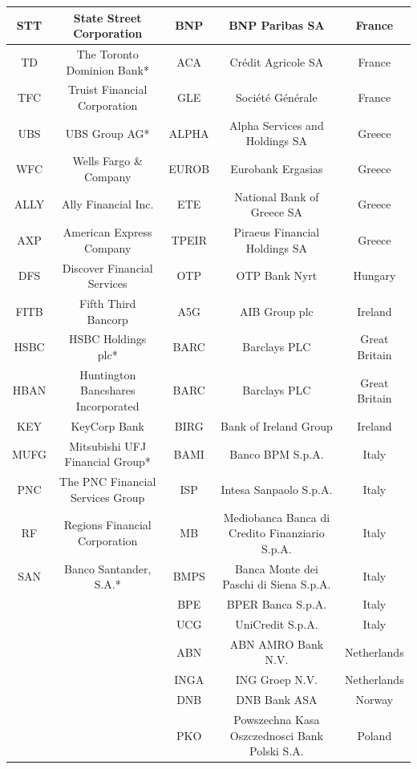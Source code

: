 \documentclass[12pt]{article}
\begin{document}
\begin{table}[!htbp]
\begin{center}
{\begin{tabular}{c|c||c |c|c}
			\hline
			STT & State Street Corporation & BNP &  BNP Paribas SA & France \\
			\hline
			TD & The Toronto Dominion Bank* & ACA & Crédit Agricole SA & France \\
			\hline
			TFC & Truist Financial Corporation & GLE & Société Générale & France \\
			\hline
			UBS & UBS Group AG* & ALPHA & Alpha Services and Holdings SA & Greece \\
			\hline
			WFC & Wells Fargo \& Company & EUROB & Eurobank Ergasias & Greece \\
			\hline
			ALLY & Ally Financial Inc. & ETE & National Bank of Greece SA & Greece \\
			\hline
			AXP & American Express Company & TPEIR & Piraeus Financial Holdings SA & Greece \\
			\hline
			DFS & Discover Financial Services & OTP & OTP Bank Nyrt & Hungary \\
			\hline
			FITB & Fifth Third Bancorp & A5G & AIB Group plc & Ireland \\
			\hline
			HSBC & HSBC Holdings plc* & BARC & Barclays PLC & Great Britain \\
			\hline
			HBAN & Huntington Bancshares Incorporated & BARC & Barclays PLC & Great Britain \\
			\hline
			KEY & KeyCorp Bank & BIRG & Bank of Ireland Group & Ireland \\
			\hline
			MUFG & Mitsubishi UFJ Financial Group* & BAMI & Banco BPM S.p.A. & Italy \\
			\hline 
			PNC & The PNC Financial Services Group & ISP & Intesa Sanpaolo S.p.A. & Italy \\
			\hline
			RF & Regions Financial Corporation & MB & Mediobanca Banca di Credito Finanziario S.p.A. & Italy \\
			\hline
			SAN & Banco Santander, S.A.* & BMPS & Banca Monte dei Paschi di Siena S.p.A. & Italy \\
			\hline
			& & BPE & BPER Banca S.p.A. & Italy \\
			\hline
			& & UCG & UniCredit S.p.A. & Italy \\
			\hline
			& & ABN & ABN AMRO Bank N.V. & Netherlands \\
			\hline
			& & INGA & ING Groep N.V. & Netherlands \\
			\hline
			& & DNB & DNB Bank ASA & Norway \\
			\hline
			& & PKO & Powszechna Kasa Oszczednosci Bank Polski S.A. & Poland \\

\end{tabular}}
\end{center}
\end{table}
\end{document}
